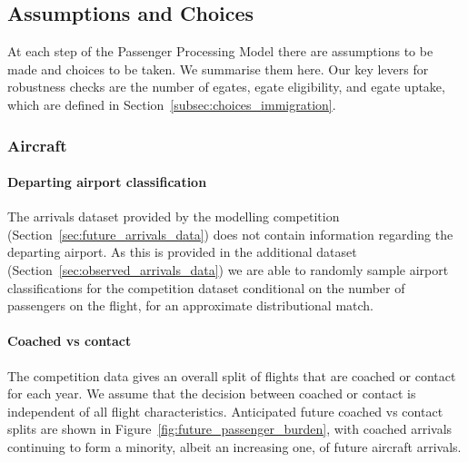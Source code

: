 \documentclass[10pt]{article}
\begin{document}
\subsection{Assumptions and Choices}
At each step of the Passenger Processing Model there are assumptions to be made and choices to be taken. We summarise them here. Our key levers for robustness checks are the number of \glspl{egate}, \gls{egate} eligibility, and \gls{egate} uptake, which are defined in Section~\ref{subsec:choices_immigration}.

\subsubsection{Aircraft}

\paragraph{Departing airport classification}
The arrivals dataset provided by the modelling competition (Section~\ref{sec:future_arrivals_data}) does not contain information regarding the departing airport. As this is provided in the additional dataset (Section~\ref{sec:observed_arrivals_data}) we are able to randomly sample airport classifications for the competition dataset conditional on the number of passengers on the flight, for an approximate distributional match. 




\paragraph{Coached vs contact}
The competition data gives an overall split of flights that are coached or contact for each year. We assume that the decision between coached or contact is independent of all flight characteristics. Anticipated future coached vs contact splits are shown in Figure~\ref{fig:future_passenger_burden}, with coached arrivals continuing to form a minority, albeit an increasing one, of future aircraft arrivals.
\end{document}
